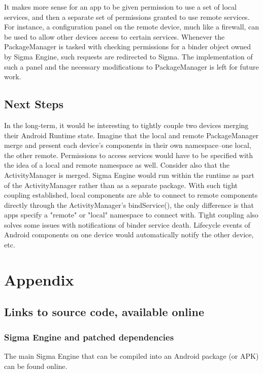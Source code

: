 \documentclass[prodmode]{acmlarge}
\begin{document}
It makes more sense for an app to be given permission to use a set of local services, and then a separate set of permissions granted to use remote services. For instance, a configuration panel on the remote device, much like a firewall, can be used to allow other devices access to certain services. Whenever the PackageManager is tasked with checking permissions for a binder object owned by Sigma Engine, such requests are redirected to Sigma. The implementation of such a panel and the necessary modifications to PackageManager is left for future work.

\subsection{Next Steps}
\label{sec:NextSteps}
In the long-term, it would be interesting to tightly couple two devices merging their Android Runtime state. Imagine that the local and remote PackageManager merge and present each device's components in their own namespace--one local, the other remote. Permissions to access services would have to be specified with the idea of a local and remote namespace as well. Consider also that the ActivityManager is merged. Sigma Engine would run within the runtime as part of the ActivityManager rather than as a separate package. With such tight coupling established, local components are able to connect to remote components directly through the ActivityManager's bindService(), the only difference is that apps specify a "remote" or "local" namespace to connect with. Tight coupling also solves some issues with notifications of binder service death. Lifecycle events of Android components on one device would automatically notify the other device, etc.



\section{Appendix}

\subsection{Links to source code, available online}
\label{app:SourceCode}

\subsubsection{Sigma Engine and patched dependencies}
The main Sigma Engine that can be compiled into an Android package (or APK) can be found online.
\end{document}
